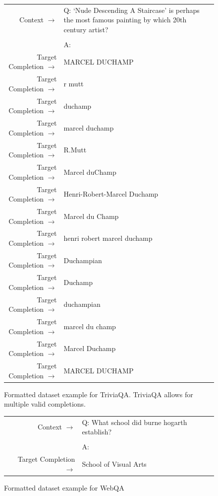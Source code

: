 \documentclass{article}
\begin{document}
\begin{figure} { \tt \footnotesize \begin{tabularx}{\linewidth}{r X} \toprule Context $\to$ & Q: `Nude Descending A Staircase' is perhaps the most famous painting by which 20th century artist? \\ 
 &  \\ 
 & A: \\ 
 \midrule Target Completion $\to$ & MARCEL DUCHAMP \\
 Target Completion $\to$ & r mutt \\
 Target Completion $\to$ & duchamp \\
 Target Completion $\to$ & marcel duchamp \\
 Target Completion $\to$ & R.Mutt \\
 Target Completion $\to$ & Marcel duChamp \\
 Target Completion $\to$ & Henri-Robert-Marcel Duchamp \\
 Target Completion $\to$ & Marcel du Champ \\
 Target Completion $\to$ & henri robert marcel duchamp \\
 Target Completion $\to$ & Duchampian \\
 Target Completion $\to$ & Duchamp \\
 Target Completion $\to$ & duchampian \\
 Target Completion $\to$ & marcel du champ \\
 Target Completion $\to$ & Marcel Duchamp \\
 Target Completion $\to$ & MARCEL DUCHAMP\\ \bottomrule \end{tabularx} }  \caption{Formatted dataset example for TriviaQA. TriviaQA allows for multiple valid completions.}  \label{eval:TriviaQA}  \end{figure}
\begin{figure} { \tt \footnotesize \begin{tabularx}{\linewidth}{r X} \toprule Context $\to$ & Q: What school did burne hogarth establish? \\ 
 &  \\ 
 & A: \\ 
 \midrule Target Completion $\to$ & School of Visual Arts \\ \bottomrule \end{tabularx} }  \caption{Formatted dataset example for WebQA}  \label{eval:WebQA-no-dev}  \end{figure}
\end{document}

